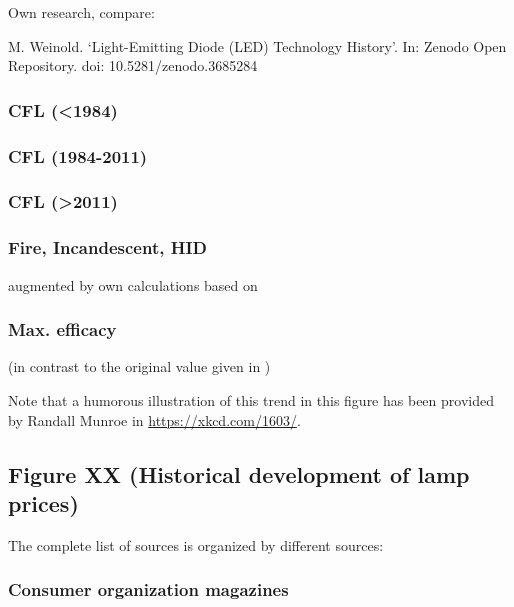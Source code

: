 \documentclass{article}
\begin{document}
Own research, compare:

M. Weinold. ‘Light-Emitting Diode (LED) Technology History’.
In: Zenodo Open Repository. doi: 10.5281/zenodo.3685284 

\subsubsection{CFL (<1984)}

\cite{Bouwknegt1982}\cite{Vrenken1983}

\subsubsection{CFL (1984-2011)}

\cite{eger2018origin}

\subsubsection{CFL (>2011)}

\cite{Guan2015}

\subsubsection{Fire, Incandescent, HID}

\cite{azevedo2009transition} augmented by own calculations based on \cite{benesch1905beleuchtungswesen}

\subsubsection{Max. efficacy}

\cite{Murphy2012} (in contrast to the original value given in \cite{azevedo2009transition})

Note that a humorous illustration of this trend in this figure has been provided by Randall Munroe in \href{https://xkcd.com/1603/}{https://xkcd.com/1603/}.

\subsection{Figure XX (Historical development of lamp prices)}

The complete list of sources is organized by different sources:

\subsubsection{Consumer organization magazines}
\end{document}
